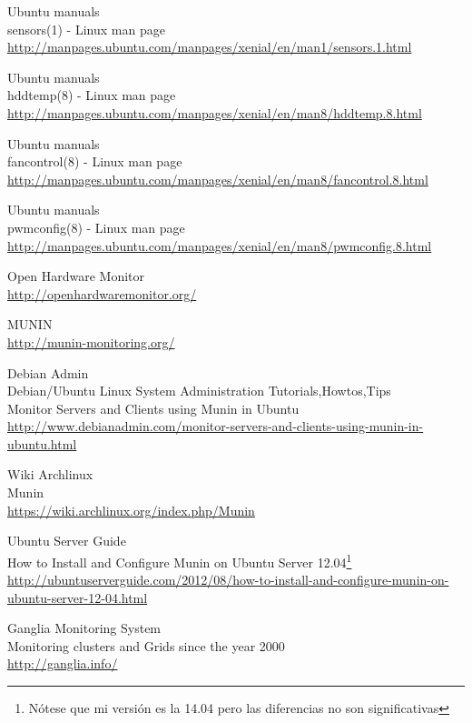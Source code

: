 \begin{thebibliography}{10}
Ubuntu manuals\\
sensors(1) - Linux man page\\
  \url{http://manpages.ubuntu.com/manpages/xenial/en/man1/sensors.1.html}

Ubuntu manuals\\
hddtemp(8) - Linux man page\\
  \url{http://manpages.ubuntu.com/manpages/xenial/en/man8/hddtemp.8.html}

Ubuntu manuals\\
fancontrol(8) - Linux man page\\
  \url{http://manpages.ubuntu.com/manpages/xenial/en/man8/fancontrol.8.html}

Ubuntu manuals\\
pwmconfig(8) - Linux man page\\
  \url{http://manpages.ubuntu.com/manpages/xenial/en/man8/pwmconfig.8.html}

Open Hardware Monitor\\
  \url{http://openhardwaremonitor.org/}

MUNIN\\
  \url{http://munin-monitoring.org/}

Debian Admin\\
Debian/Ubuntu Linux System Administration Tutorials,Howtos,Tips\\
Monitor Servers and Clients using Munin in Ubuntu\\
  \url{http://www.debianadmin.com/monitor-servers-and-clients-using-munin-in-ubuntu.html}

Wiki Archlinux\\
Munin\\
  \url{https://wiki.archlinux.org/index.php/Munin}

Ubuntu Server Guide\\
How to Install and Configure Munin on Ubuntu Server 12.04\footnote{Nótese que mi
versión es la 14.04 pero las diferencias no son significativas}\\
  \url{http://ubuntuserverguide.com/2012/08/how-to-install-and-configure-munin-on-ubuntu-server-12-04.html}


Ganglia Monitoring System\\
Monitoring clusters and Grids since the year 2000\\
  \url{http://ganglia.info/}


\end{thebibliography}
